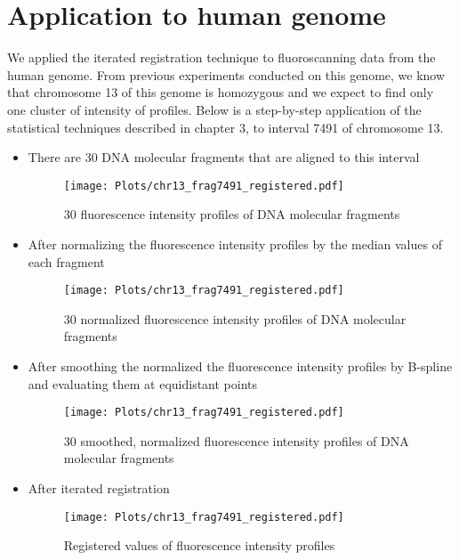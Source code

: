 \section{Application to human genome}

We applied the iterated registration technique to fluoroscanning data from the human genome. From previous experiments conducted on this genome, we know that chromosome 13 of this genome is homozygous and we expect to find only one cluster of intensity of profiles. Below is a step-by-step application of the statistical techniques described in chapter 3, to interval 7491 of chromosome 13.
\begin{itemize}
\item There are 30 DNA molecular fragments that are aligned to this interval
\begin{figure}[H]
\begin{center}
\texttt{[image: Plots/chr13\_frag7491\_registered.pdf]}
\end{center}
\caption{30 fluorescence intensity profiles of DNA molecular fragments}
\label{fig:Frag7491_Orig}
\end{figure}

\item After normalizing the fluorescence intensity profiles by the median values of each fragment
\begin{figure}[H]
\begin{center}
\texttt{[image: Plots/chr13\_frag7491\_registered.pdf]}
\end{center}
\caption{30 normalized fluorescence intensity profiles of DNA molecular fragments}
\label{fig:Frag7491_Norm}
\end{figure}

\item After smoothing the normalized the fluorescence intensity profiles by B-spline and evaluating them at equidistant points
\begin{figure}[H]
\begin{center}
\texttt{[image: Plots/chr13\_frag7491\_registered.pdf]}
\end{center}
\caption{30 smoothed, normalized fluorescence intensity profiles of DNA molecular fragments}
\label{fig:Frag7491_Smooth}
\end{figure}

\item After iterated registration
\begin{figure}[H]
\begin{center}
\texttt{[image: Plots/chr13\_frag7491\_registered.pdf]}
\end{center}
\caption{Registered values of fluorescence intensity profiles}
\label{fig:Frag7491_Regist}
\end{figure}


\end{itemize}
